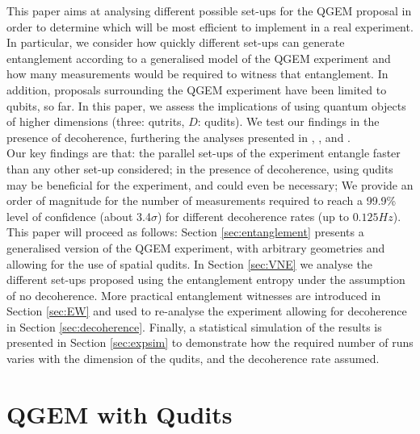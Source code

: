 \documentclass[%
 12pt,
 superscriptaddress,
 amsmath,
 amssymb,
 onecolumn,
 longbibliography
]{revtex4-2}
\begin{document}
\indent This paper aims at analysing different possible set-ups for the QGEM proposal in order to determine which will be most efficient to implement in a real experiment. In particular, we consider how quickly different set-ups can generate entanglement according to a generalised model of the QGEM experiment and how many measurements would be required to witness that entanglement. In addition, proposals surrounding the QGEM experiment have been limited to qubits, so far. In this paper, we assess the implications of using quantum objects of higher dimensions (three: qutrits, $D$: qudits). We test our findings in the presence of decoherence, furthering the analyses presented in \cite{Nguyen2019}, \cite{Chevalier:2020uvv}, \cite{Kamp2020} and \cite{torovs2020relative}. \\
\indent Our key findings are that: the parallel set-ups \cite{Nguyen2019} of the experiment entangle faster than any other set-up considered; in the presence of decoherence, using qudits may be beneficial for the experiment, and could even be necessary; We provide an order of magnitude for the number of measurements required to reach a 99.9\% level of confidence (about 3.4$\sigma$) for different decoherence rates (up to $0.125Hz$). \\
\indent This paper will proceed as follows: Section \ref{sec:entanglement} presents a generalised version of the QGEM experiment, with arbitrary geometries and allowing for the use of spatial qudits. In Section \ref{sec:VNE} we analyse the different set-ups proposed using the entanglement entropy under the assumption of no decoherence. More practical entanglement witnesses are introduced in Section \ref{sec:EW} and used to re-analyse the experiment allowing for decoherence in Section \ref{sec:decoherence}. Finally, a statistical simulation of the results is presented in Section \ref{sec:expsim} to demonstrate how the required number of runs varies with the dimension of the qudits, and the decoherence rate assumed.


\section{QGEM with Qudits \label{sec:entanglement}}
\end{document}
